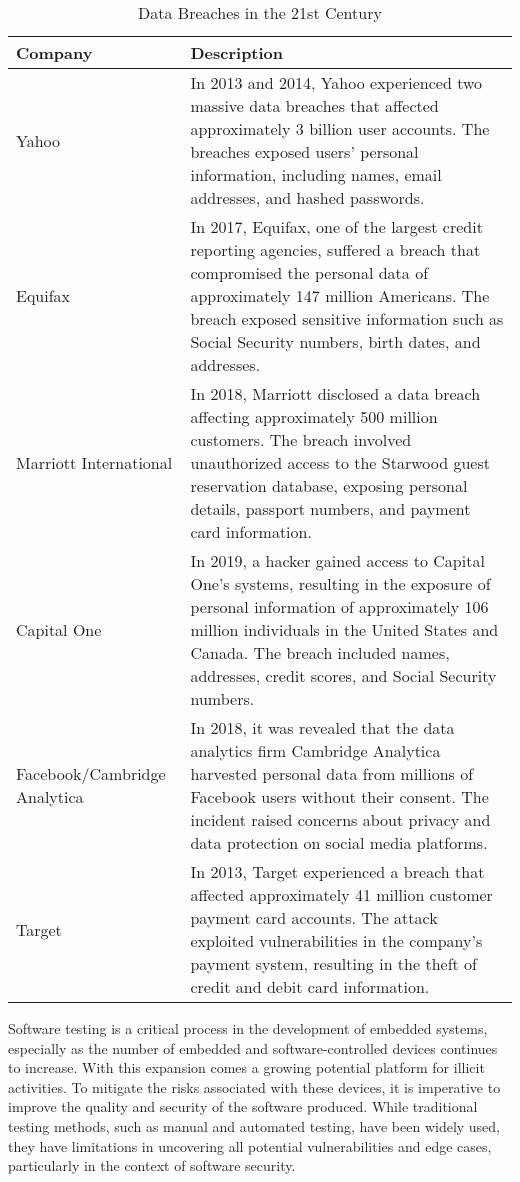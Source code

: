 \begin{table}[ht]
\caption{Data Breaches in the 21st Century}
\label{tab:data_breaches}
\begin{tabularx}{\textwidth}{|l|X|}
\hline
\textbf{Company} & \textbf{Description} \\
\hline
Yahoo & In 2013 and 2014, Yahoo experienced two massive data breaches that affected approximately 3 billion user accounts. The breaches exposed users' personal information, including names, email addresses, and hashed passwords. \\
\hline
Equifax & In 2017, Equifax, one of the largest credit reporting agencies, suffered a breach that compromised the personal data of approximately 147 million Americans. The breach exposed sensitive information such as Social Security numbers, birth dates, and addresses. \\
\hline
Marriott International & In 2018, Marriott disclosed a data breach affecting approximately 500 million customers. The breach involved unauthorized access to the Starwood guest reservation database, exposing personal details, passport numbers, and payment card information. \\
\hline
Capital One & In 2019, a hacker gained access to Capital One's systems, resulting in the exposure of personal information of approximately 106 million individuals in the United States and Canada. The breach included names, addresses, credit scores, and Social Security numbers. \\
\hline
Facebook/Cambridge Analytica & In 2018, it was revealed that the data analytics firm Cambridge Analytica harvested personal data from millions of Facebook users without their consent. The incident raised concerns about privacy and data protection on social media platforms. \\
\hline
Target & In 2013, Target experienced a breach that affected approximately 41 million customer payment card accounts. The attack exploited vulnerabilities in the company's payment system, resulting in the theft of credit and debit card information. \\
\hline
\end{tabularx}
\end{table}

Software testing\cite{myers2011art} is a critical process in the development of embedded systems,
especially as the number of embedded and software-controlled devices continues
to increase. With this expansion comes a growing potential platform for
illicit activities\cite{broekman2003testing}. To mitigate the risks associated with these devices,
it is imperative to improve the quality and security of the software produced.
While traditional testing methods, such as manual\cite{itkonen2009testers} and automated testing\cite{asfaw2015benefits},
have been widely used, they have limitations in uncovering all potential
vulnerabilities and edge cases, particularly in the context of software security\cite{819971}.

